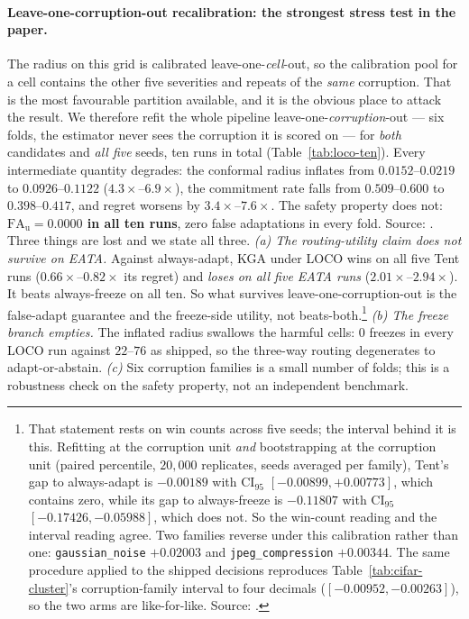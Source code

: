 \paragraph{Leave-one-corruption-out recalibration: the strongest stress test in the paper.} The
radius on this grid is calibrated leave-one-\emph{cell}-out, so the calibration pool for a cell
contains the other five severities and repeats of the \emph{same} corruption. That is the most
favourable partition available, and it is the obvious place to attack the result. We therefore refit
the whole pipeline leave-one-\emph{corruption}-out --- six folds, the estimator never sees the
corruption it is scored on --- for \emph{both} candidates and \emph{all five} seeds, ten runs in
total (Table~\ref{tab:loco-ten}). Every intermediate quantity degrades: the conformal radius inflates
from $0.0152$--$0.0219$ to $0.0926$--$0.1122$ ($4.3\times$--$6.9\times$), the commitment rate falls
from $0.509$--$0.600$ to $0.398$--$0.417$, and regret worsens by $3.4\times$--$7.6\times$. The
safety property does not: \textbf{$\mathrm{FA}_{\mathrm u}=0.0000$ in all ten runs}, zero false
adaptations in every fold. Source:
. Three things are lost and
we state all three. \emph{(a) The routing-utility claim does not survive on EATA.} Against
always-adapt, \textsc{KGA} under LOCO wins on all five Tent runs ($0.66\times$--$0.82\times$ its
regret) and \emph{loses on all five EATA runs} ($2.01\times$--$2.94\times$). It beats always-freeze
on all ten. So what survives leave-one-corruption-out is the false-adapt guarantee and the
freeze-side utility, not beats-both.\footnote{That statement rests on win counts across five seeds; the interval behind it is this. Refitting at the corruption unit \emph{and} bootstrapping at the corruption unit (paired percentile, $20{,}000$ replicates, seeds averaged per family), Tent's gap to always-adapt is $-0.00189$ with CI$_{95}$ $[-0.00899,+0.00773]$, which contains zero, while its gap to always-freeze is $-0.11807$ with CI$_{95}$ $[-0.17426,-0.05988]$, which does not. So the win-count reading and the interval reading agree. Two families reverse under this calibration rather than one: \texttt{gaussian\_noise} $+0.02003$ and \texttt{jpeg\_compression} $+0.00344$. The same procedure applied to the shipped decisions reproduces Table~\ref{tab:cifar-cluster}'s corruption-family interval to four decimals ($[-0.00952,-0.00263]$), so the two arms are like-for-like. Source: .} \emph{(b) The freeze branch empties.} The inflated radius
swallows the harmful cells: $0$ freezes in every LOCO run against $22$--$76$ as shipped, so the
three-way routing degenerates to adapt-or-abstain. \emph{(c)} Six corruption families is a small
number of folds; this is a robustness check on the safety property, not an independent benchmark.

